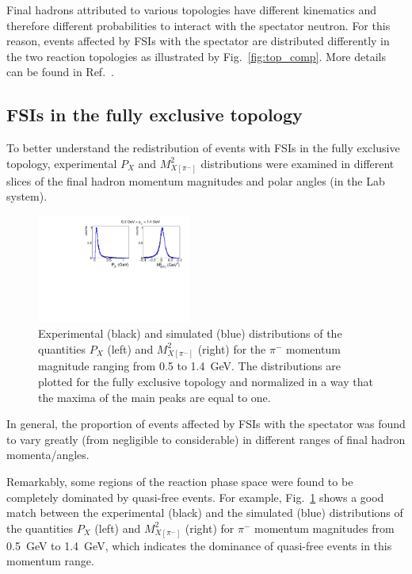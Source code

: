 \documentclass[prc,twocolumn,superscriptaddress,showpacs,amssymb,amsmath,amsfonts,aps,nofootinbib]{revtex4-1}
\begin{document}
Final hadrons attributed to various topologies have different kinematics and therefore different probabilities to interact with the spectator neutron. For this reason, events affected by FSIs with the spectator are distributed differently in the two reaction topologies as illustrated by Fig.\!~\ref{fig:top_comp}. More details can be found in Ref.\!~\cite{my_thesis:2021}.



\subsection{FSIs in the fully exclusive topology}
\label{Sect:fsi_fully_excl}



To better understand the redistribution of events with FSIs in the fully exclusive topology, experimental $P_{X}$ and  $M^{2}_{X[\pi^{-}]}$ distributions were examined in different slices of the final hadron momentum magnitudes and polar angles (in the Lab system). 



\begin{figure}[htp]
\begin{center}
\includegraphics[width=0.45\textwidth]{pictures/fsi/quasi_free2.pdf}
\caption{\small Experimental (black) and simulated (blue) distributions of the quantities $P_{X}$ (left) and $M^{2}_{X[\pi^{-}]}$ (right) for the $\pi^{-}$ momentum magnitude ranging from 0.5 to 1.4~GeV. The distributions are plotted for the fully exclusive topology and normalized in a way that the maxima of the main peaks are equal to one.} \label{fig:fsi_pim_mom}
\end{center}
\end{figure}

In general, the proportion of events affected by FSIs with the spectator was found to vary greatly (from negligible to considerable) in different ranges of final hadron momenta/angles.  



Remarkably, some regions of the reaction phase space were found to be completely dominated by quasi-free events.  For example, Fig.\!~\ref{fig:fsi_pim_mom} shows a good match between the experimental (black) and the simulated (blue) distributions of the quantities $P_{X}$ (left) and $M^{2}_{X[\pi^{-}]}$ (right) for $\pi^{-}$ momentum magnitudes from 0.5~GeV to 1.4~GeV, which indicates the dominance of quasi-free events in this momentum range.
\end{document}
